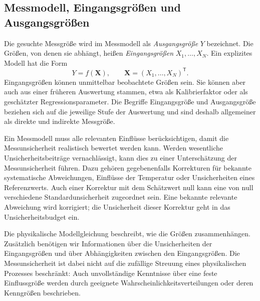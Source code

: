 \subsection{Messmodell, Eingangsgrößen und Ausgangsgrößen}

Die gesuchte Messgröße wird im Messmodell als \textsl{Ausgangsgröße} $Y$
bezeichnet. Die Größen, von denen sie abhängt, heißen \textsl{Eingangsgrößen}
$X_1,\dots,X_N$. Ein explizites Modell hat die Form
\begin{equation}
Y=f(\mathbf X),\qquad
\mathbf X=(X_1,\dots,X_N)^\mathsf T.
\label{explizitUnivariat}
\end{equation}
Eingangsgrößen können unmittelbar beobachtete Größen sein. Sie können aber
auch aus einer früheren Auswertung stammen, etwa als Kalibrierfaktor oder
als geschätzter Regressionsparameter. Die Begriffe \glqq Eingangsgröße\grqq{}
und \glqq Ausgangsgröße\grqq{} beziehen sich auf die jeweilige Stufe der
Auswertung und sind deshalb allgemeiner als \glqq direkte\grqq{} und
\glqq indirekte Messgröße\grqq{}.

Ein Messmodell muss alle relevanten Einflüsse berücksichtigen, damit die Messunsicherheit realistisch bewertet werden kann. Werden wesentliche Unsicherheitsbeiträge vernachlässigt, kann dies zu einer Unterschätzung der Messunsicherheit führen. Dazu gehören gegebenenfalls Korrekturen für
bekannte systematische Abweichungen, Einflüsse der Temperatur oder
Unsicherheiten eines Referenzwerts. Auch einer Korrektur mit dem Schätzwert
null kann eine von null verschiedene Standardunsicherheit zugeordnet sein.
Eine bekannte relevante Abweichung wird korrigiert; die Unsicherheit dieser
Korrektur geht in das Unsicherheitsbudget ein.

Die physikalische Modellgleichung beschreibt, wie die Größen zusammenhängen.
Zusätzlich benötigen wir Informationen über die Unsicherheiten der Eingangsgrößen und über Abhängigkeiten zwischen den Eingangsgrößen.
Die Messunsicherheit ist dabei nicht auf die zufällige Streuung eines physikalischen Prozesses beschränkt:
Auch unvollständige Kenntnisse über eine feste Einflussgröße werden durch
geeignete Wahrscheinlichkeitsverteilungen oder deren Kenngrößen beschrieben.

